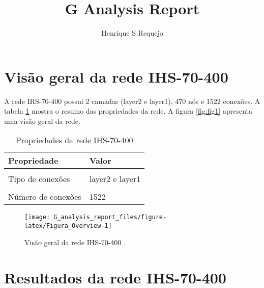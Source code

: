 \documentclass[
  12pt,
]{article}
\title{G Analysis Report}
\author{Henrique S Requejo}
\date{}
\begin{document}
\maketitle


\pagebreak

\tableofcontents

\pagebreak


\hypertarget{visuxe3o-geral-da-rede-ihs-70-400}{%
\section{Visão geral da rede
IHS-70-400}\label{visuxe3o-geral-da-rede-ihs-70-400}}

A rede IHS-70-400 possui 2 camadas (layer2 e layer1), 470 nós e 1522
conexões. A tabela \ref{tab:1} mostra o resumo das propriedades da rede.
A figura \ref{fig:fig1} apresenta uma visão geral da rede.

\begin{table}[!h]

\caption{\label{tab:Tabela_Prop_Rede}\label{tab:1}Propriedades da rede  IHS-70-400}
\centering
\begin{tabular}[t]{ll}
\toprule
Propriedade & Valor\\
\midrule
\cellcolor{gray!6}{Número de Camadas} & \cellcolor{gray!6}{2}\\
Tipo de conexões & layer2  e  layer1\\
\cellcolor{gray!6}{Número de nós} & \cellcolor{gray!6}{470}\\
Número de conexões & 1522\\
\bottomrule
\end{tabular}
\end{table}

\begin{figure}[H]

{\centering \texttt{[image: G\_analysis\_report\_files/figure-latex/Figura\_Overview-1]} 

}

\caption{\label{fig:fig1}Visão geral da rede  IHS-70-400 .}\label{fig:Figura_Overview}
\end{figure}

\hypertarget{resultados-da-rede-ihs-70-400}{%
\section{Resultados da rede
IHS-70-400}\label{resultados-da-rede-ihs-70-400}}
\end{document}
